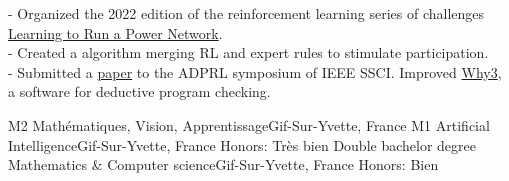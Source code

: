 \documentclass[
    10pt,
    A4,
    english,
    draft = false,
    twoside = false,
]{article}
\begin{document}
	
	
	{
	  - Organized the 2022 edition of the reinforcement learning              series of challenges
	   \href{https://l2rpn.chalearn.org/}{Learning to Run a Power Network}.\\
	  - Created a algorithm merging RL and expert rules to stimulate
        participation.\\
      - Submitted a
	    \href{https://hal.inria.fr/hal-03726294v2}{paper} to the ADPRL symposium of IEEE SSCI.
	    \vspace*{0.2cm}
	}
	{Improved \href{https://why3.lri.fr/}{Why3}, a software for
	deductive program checking.}
	
	{M2 Mathématiques, Vision, Apprentissage}{Gif-Sur-Yvette, France}
	{}
	{M1 Artificial Intelligence}{Gif-Sur-Yvette, France}
	{Honors: Très bien}
	{Double bachelor degree Mathematics \& Computer science}{Gif-Sur-Yvette,
	France}
	{Honors: Bien}
	
\end{document}
